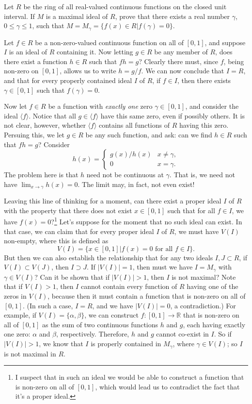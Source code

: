 \documentclass[12pt]{article}
\newcommand{\R}{\mathbb{R}}
\begin{document}
Let $R$ be the ring of all real-valued continuous functions on the closed unit interval.
If $M$ is a maximal ideal of $R$, prove that there exists a real number $\gamma$,
$0\leq\gamma\leq 1$, such that $M=M_{\gamma}=\{f(x)\in R|f(\gamma)=0\}$.

Let $f\in R$ be a non-zero-valued continuous function on all of $[0,1]$, and suppose $I$ is an ideal of $R$
containing it.  Now letting $g\in R$ be any member of $R$, does there exist a function $h\in R$ such that
$fh=g$?  Clearly there must, since $f$, being non-zero on $[0,1]$, allows us to write $h=g/f$.
We can now conclude that $I=R$, and that for every properly contained ideal $I$ of $R$, if $f\in I$,
then there exists $\gamma\in[0,1]$ such that $f(\gamma)=0$.

Now let $f\in R$ be a function with {\it exactly one} zero $\gamma\in[0,1]$, and consider the ideal $\langle f\rangle$.
Notice that all $g\in\langle f\rangle$ have this same zero, even if possibly others.
It is not clear, however, whether $\langle f\rangle$ contains all functions of $R$ having this zero.
Persuing this, we let $g\in R$ be any such function, and ask: can we find $h\in R$ such that $fh=g$?  Consider
\begin{equation*}
h(x)=\left\{\begin{array}{ll} g(x)/h(x) & x\neq\gamma, \\ 0 & x=\gamma. \end{array}\right.
\end{equation*}
The problem here is that $h$ need not be continuous at $\gamma$.  That is, we need not have
$\lim_{x\to\gamma} h(x)=0$.  The limit may, in fact, not even exist!

Leaving this line of thinking for a moment, can there exist a proper ideal $I$ of $R$ with the
property that there does not exist $x\in[0,1]$ such that for all $f\in I$, we have $f(x)=0$?\footnote{I suspect that
in such an ideal we would be able to construct a function that is non-zero on all of $[0,1]$, which would lead us to
contradict the fact that it's a proper ideal.}
Let's suppose for the moment that no such ideal can exist.  In that case, we can claim that
for every proper ideal $I$ of $R$, we must have $V(I)$ non-empty, where this is defined as
\begin{equation*}
V(I)=\{x\in[0,1]|\mbox{$f(x)=0$ for all $f\in I$}\}.
\end{equation*}
But then we can also establish the relationship that for any two ideals $I,J\subset R$,
if $V(I)\subset V(J)$, then $I\supset J$.  If $|V(I)|=1$, then must we have $I=M_{\gamma}$
with $\gamma\in V(I)$?  Can it be shown that if $|V(I)|>1$, then $I$ is not maximal?
Note that if $V(I)>1$, then $I$ cannot contain every function of $R$ having one of the zeros in $V(I)$,
because then it must contain a function that is non-zero on all of $[0,1]$.  (In such a case, $I=R$, and we have $|V(I)|=0$,
a contradiction.)  For example, if $V(I)=\{\alpha,\beta\}$, we can construct $f:[0,1]\to\R$ that is non-zero on all of $[0,1]$
as the sum of two continuous functions $h$ and $g$, each having exactly one zero: $\alpha$ and $\beta$, respectively.
Therefore, $h$ and $g$ cannot co-exist in $I$.
So if $|V(I)|>1$, we know that $I$ is properly contained in $M_{\gamma}$, where $\gamma\in V(I)$;
so $I$ is not maximal in $R$.
\end{document}
